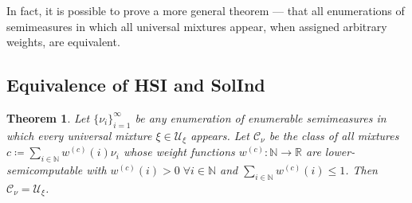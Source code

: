 \documentclass[11pt]{article}
\newtheorem{theorem}{Theorem}[section]
\begin{document}
In fact, it is possible to prove a more general theorem --- that all enumerations of semimeasures in which all universal mixtures appear, when assigned arbitrary weights, are equivalent.


\subsection{Equivalence of HSI and SolInd}

\begin{theorem}
\label{thm:enums-of-ums=ums}
Let $\{\nu_i\}_{i=1}^\infty$ be any enumeration of enumerable semimeasures in which every universal mixture $\xi\in\mathcal{U}_\xi$ appears.
Let $\mathcal{C}_\nu$ be the class of all mixtures $c\coloneq\sum_{i\in\mathbb{N}} w^{(c)}(i)\nu_i$ whose weight functions $w^{(c)}:\mathbb{N}\to\mathbb{R}$ are lower-semicomputable with $w^{(c)}(i)>0\;\forall i\in\mathbb{N}$ and $\sum_{i\in\mathbb{N}}w^{(c)}(i)\leq1$.
Then $\mathcal{C}_\nu=\mathcal{U}_\xi$.
\end{theorem}
\end{document}
